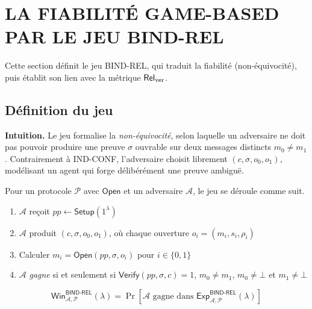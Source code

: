 \section{LA FIABILIT\'E GAME-BASED PAR LE JEU BIND-REL}
\label{sec:gamebased_fiabilite}
\begin{sloppypar}

Cette section d\'efinit le jeu BIND-REL, qui traduit la fiabilit\'e (non-\'equivocit\'e),
puis \'etablit son lien avec la m\'etrique $\mathsf{Rel}_{\mathrm{ver}}$.

\subsection{D\'efinition du jeu}

\noindent\textbf{Intuition.} Le jeu formalise la \emph{non-\'equivocit\'e},
selon laquelle un adversaire ne doit pas pouvoir produire une preuve $\sigma$ ouvrable
sur deux messages distincts $m_0 \neq m_1$. Contrairement \`a IND-CONF,
l'adversaire choisit librement $(c, \sigma, o_0, o_1)$, mod\'elisant
un agent qui forge d\'elib\'er\'ement une preuve ambiguë.

\begin{definition}\label{def:ann_bind_rel}
Pour un protocole $\mathcal{P}$ avec $\mathsf{Open}$ et un adversaire
$\mathcal{A}$, le jeu se d\'eroule comme suit.
\begin{enumerate}
\item $\mathcal{A}$ reçoit $pp \leftarrow \mathsf{Setup}(1^\lambda)$
\item $\mathcal{A}$ produit $(c, \sigma, o_0, o_1)$, o\`u chaque ouverture
      $o_i = (m_i, s_i, \rho_i)$
\item Calculer $m_i = \mathsf{Open}(pp, \sigma, o_i)$ pour $i \in \{0,1\}$
\item $\mathcal{A}$ \emph{gagne} si et seulement si
  $\mathsf{Verify}(pp,\sigma,c)=1$,
  $m_0 \neq m_1$,
  $m_0 \neq \bot$ et $m_1 \neq \bot$
\end{enumerate}
\begin{equation}
\mathsf{Win}^{\mathsf{BIND\text{-}REL}}_{\mathcal{A},\mathcal{P}}(\lambda)
= \Pr\!\left[\mathcal{A} \text{ gagne dans }
\mathsf{Exp}^{\mathsf{BIND\text{-}REL}}_{\mathcal{A},\mathcal{P}}(\lambda)
\right]
\end{equation}
\end{definition}


\end{sloppypar}
